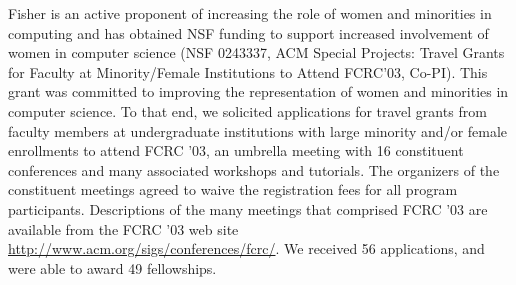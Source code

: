 \documentclass[11pt]{article}
\begin{document}
Fisher is an active proponent of increasing the
role of women and minorities in computing and has
obtained NSF funding to support increased involvement of women
in computer science (NSF 0243337, ACM Special Projects: 
Travel Grants for Faculty at Minority/Female Institutions to Attend
FCRC'03, Co-PI).  This grant was committed to improving the representation of women and
minorities in computer science. To that end, we solicited applications
for travel grants from faculty members at undergraduate institutions
with large minority and/or female enrollments to attend FCRC '03, an
umbrella meeting with 16 constituent conferences and many associated
workshops and tutorials.  The organizers of the constituent meetings agreed to waive
the registration fees for all program participants. 
Descriptions of the many meetings that
comprised FCRC '03 are available from the FCRC '03 web site 
\url{http://www.acm.org/sigs/conferences/fcrc/}.  We
received 56 applications, and were able to award 49
fellowships.






%
\end{document}
